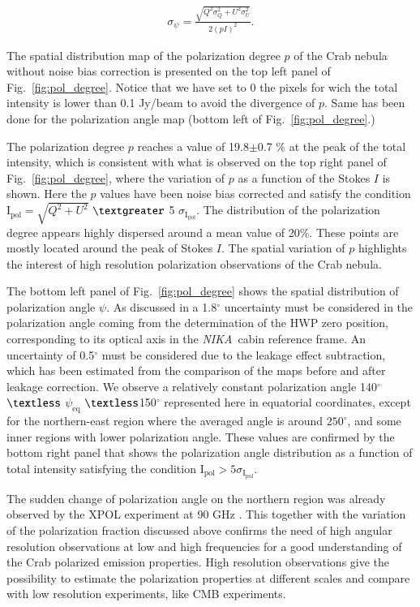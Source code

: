 \documentclass[twocolumn,traditabstract]{aa}
\def\NIKA{\textit{NIKA}}
\begin{document}
  \begin{eqnarray}\label{angle_uncertainty}
  \sigma_{\psi} = \frac{\sqrt{Q^2\sigma_Q^2 + U^2\sigma_U^2}}{2(pI)^2}.
  \end{eqnarray}

The spatial distribution map of the polarization degree $p$ of the Crab nebula
without noise bias correction is presented on the top left panel of
Fig.~\ref{fig:pol_degree}. Notice that we have set to 0 the pixels for wich the total intensity is lower than 0.1 Jy/beam to avoid the divergence of $p$. Same has been done for the polarization angle map (bottom left of Fig.~\ref{fig:pol_degree}.)

The polarization degree $p$ reaches a value of 19.8$\pm$0.7 \% at
the peak of the total intensity, which is consistent with what is observed on the
top right panel of Fig.~\ref{fig:pol_degree}, where the variation of $p$ as a
function of the Stokes $I$ is shown.  Here the $p$ values have been noise bias
corrected and satisfy the condition $\textrm{I}_{\textrm{pol}}=\sqrt{Q^2+U^2}$ $\textgreater$ 5
$\sigma_{\textrm{I}_{\textrm{pol}}}$. The distribution of the polarization degree appears highly
dispersed around a mean value of 20\%. These points are mostly located around the peak of Stokes $I$. 
The spatial variation of $p$ highlights the interest of high resolution polarization
observations of the Crab nebula. 

The bottom left panel of Fig.~\ref{fig:pol_degree} shows the spatial distribution of polarization angle
$\psi$. As discussed in \cite{ritacco2017} a 1.8$^{\circ}$ uncertainty must be considered in the polarization angle coming from the determination of the HWP zero position, corresponding to its optical axis in the \NIKA\ cabin reference frame. An uncertainty of 0.5$^{\circ}$ must be considered due to the leakage effect subtraction, which has been estimated from the comparison of the maps before and after leakage correction. We observe a relatively constant polarization
angle 140$^{\circ}$ $\textless$ $\psi_{\textrm{eq}}$ $\textless$150$^{\circ}$ represented here in equatorial coordinates, except
for the northern-east region where the averaged angle is around $250^{\circ}$, and
some inner regions with lower polarization angle.  These values are confirmed by
the bottom right panel that shows the polarization angle distribution as a
function of total intensity satisfying the condition ${\textrm{I}_{\textrm{pol}}} > 5\sigma_{{\textrm{I}_{\textrm{pol}}}}$.

The sudden change of polarization angle on the northern region was already
observed by the XPOL experiment at 90 GHz \citep{aumont2010}.  This together
with the variation of the polarization fraction discussed above confirms the
need of high angular resolution observations at low and high frequencies for a
good understanding of the Crab polarized emission properties.
High resolution observations give the possibility to estimate the polarization properties at different scales and compare with low resolution experiments, like CMB experiments.
\end{document}
